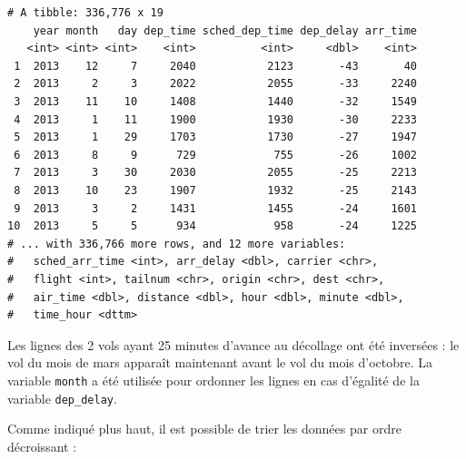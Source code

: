 \documentclass[a4paperpaper,]{article}
\newenvironment{Shaded}{\begin{snugshade}}{\end{snugshade}}
\newcommand{\KeywordTok}[1]{\textcolor[rgb]{0.12,0.11,0.11}{\textbf{#1}}}
\newcommand{\NormalTok}[1]{\textcolor[rgb]{0.12,0.11,0.11}{#1}}
\newcommand{\OperatorTok}[1]{\textcolor[rgb]{0.12,0.11,0.11}{#1}}
\newcommand{\StringTok}[1]{\textcolor[rgb]{0.75,0.01,0.01}{#1}}
\begin{document}
\begin{Shaded}
\end{Shaded}

\begin{verbatim}
# A tibble: 336,776 x 19
    year month   day dep_time sched_dep_time dep_delay arr_time
   <int> <int> <int>    <int>          <int>     <dbl>    <int>
 1  2013    12     7     2040           2123       -43       40
 2  2013     2     3     2022           2055       -33     2240
 3  2013    11    10     1408           1440       -32     1549
 4  2013     1    11     1900           1930       -30     2233
 5  2013     1    29     1703           1730       -27     1947
 6  2013     8     9      729            755       -26     1002
 7  2013     3    30     2030           2055       -25     2213
 8  2013    10    23     1907           1932       -25     2143
 9  2013     3     2     1431           1455       -24     1601
10  2013     5     5      934            958       -24     1225
# ... with 336,766 more rows, and 12 more variables:
#   sched_arr_time <int>, arr_delay <dbl>, carrier <chr>,
#   flight <int>, tailnum <chr>, origin <chr>, dest <chr>,
#   air_time <dbl>, distance <dbl>, hour <dbl>, minute <dbl>,
#   time_hour <dttm>
\end{verbatim}

Les lignes des 2 vols ayant 25 minutes d'avance au décollage ont été inversées : le vol du mois de mars apparaît maintenant avant le vol du mois d'octobre. La variable \texttt{month} a été utilisée pour ordonner les lignes en cas d'égalité de la variable \texttt{dep\_delay}.

Comme indiqué plus haut, il est possible de trier les données par ordre décroissant :

\begin{Shaded}
\end{Shaded}
\end{document}
